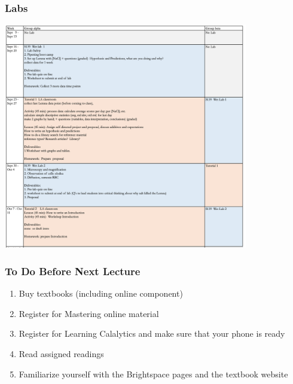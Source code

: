 \documentclass[10pt]{beamer}
\begin{document}
\begin{frame}[t]
\frametitle{Labs}

	\begin{center}
		\includegraphics[width=0.8\textwidth]{figures/labs.png}
	\end{center}
\end{frame}


\begin{frame}[t]
\frametitle{To Do Before Next Lecture}
\vspace{0.5cm}

	\begin{enumerate}
		\item Buy textbooks (including online component)
		\medskip
		\item Register for Mastering online material
		\medskip
		\item Register for Learning Calalytics and make sure that your phone is ready
		\medskip
		\item Read assigned readings
		\medskip
		\item Familiarize yourself with the Brightspace pages and the textbook website
	\end{enumerate}
\end{frame}
	
\end{document}

